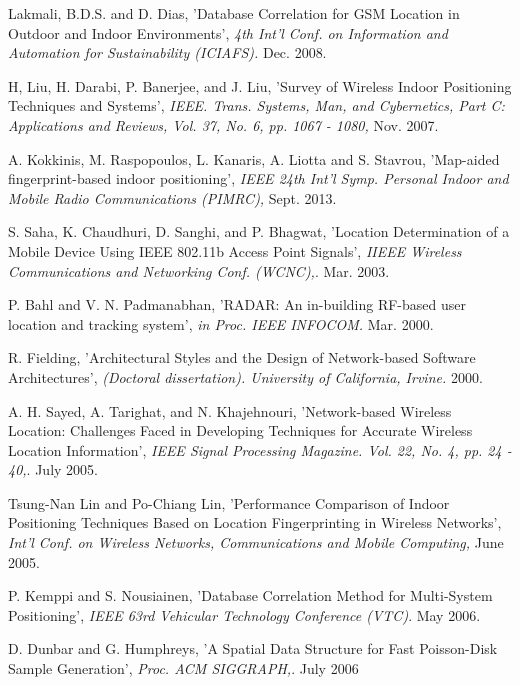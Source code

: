\documentclass[conference]{IEEEtran}
\begin{document}
\begin{thebibliography}{99}

 Lakmali, B.D.S. and D. Dias,
'Database Correlation for GSM Location in Outdoor and Indoor Environments',
\emph{4th Int'l Conf. on Information and Automation for Sustainability (ICIAFS).} Dec. 2008.

 H, Liu, H. Darabi, P. Banerjee, and J. Liu,
'Survey of Wireless Indoor Positioning Techniques and Systems',
\emph{ IEEE. Trans. Systems, Man, and Cybernetics, Part C: Applications and Reviews, Vol. 37, No. 6, pp. 1067 - 1080,} Nov. 2007.

 A. Kokkinis, M. Raspopoulos, L. Kanaris, A. Liotta and S. Stavrou,
'Map-aided fingerprint-based indoor positioning',
\emph{IEEE 24th Int'l Symp. Personal Indoor and Mobile Radio Communications (PIMRC),} Sept. 2013.

 S. Saha, K. Chaudhuri, D. Sanghi, and P. Bhagwat,
'Location Determination of a Mobile Device Using IEEE 802.11b Access Point Signals',
\emph{IIEEE Wireless Communications and Networking Conf. (WCNC),}. Mar. 2003.

 P. Bahl and V. N. Padmanabhan,
'RADAR: An in-building RF-based user location and tracking system',
\emph{in Proc. IEEE INFOCOM.} Mar. 2000.

 R. Fielding,
'Architectural Styles and the Design of Network-based Software Architectures',
\emph{ (Doctoral dissertation). University of California, Irvine.} 2000.

  A. H. Sayed, A. Tarighat, and N. Khajehnouri,
'Network-based Wireless Location: Challenges Faced in Developing Techniques for Accurate Wireless Location Information',
\emph{IEEE Signal Processing Magazine. Vol. 22, No. 4, pp. 24 - 40,}. July 2005.
 
 Tsung-Nan Lin and Po-Chiang Lin,
'Performance Comparison of Indoor Positioning Techniques Based on Location Fingerprinting in Wireless Networks',
\emph{Int'l Conf. on Wireless Networks, Communications and Mobile Computing,} June 2005.
 
 P. Kemppi and S. Nousiainen,
'Database Correlation Method for Multi-System Positioning',
\emph{IEEE 63rd Vehicular Technology Conference (VTC)}. May 2006.

 D. Dunbar and G. Humphreys,
'A Spatial Data Structure for Fast Poisson-Disk Sample Generation',
\emph{Proc. ACM SIGGRAPH,}. July 2006


\end{thebibliography}
\end{document}
